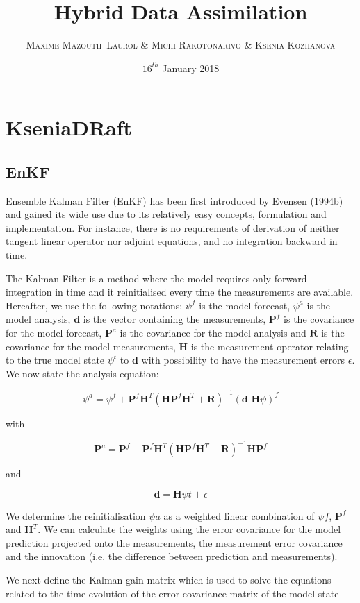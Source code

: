 \documentclass[a4,12pt]{article}
\title{\textbf{Hybrid Data Assimilation}}
\author{
\begin{tabular}{cc}
	\textsc{Maxime Mazouth--Laurol} \& \textsc{Michi Rakotonarivo} \& \textsc{Ksenia Kozhanova}
\end{tabular}}
\date{\small $16^{th}$ January 2018}
\begin{document}
\maketitle

\section{KseniaDRaft}
\subsection{EnKF}
Ensemble Kalman Filter (EnKF) has been first introduced by Evensen (1994b) and gained its wide use due to its relatively easy concepts, formulation and implementation. For instance, there is no requirements of derivation of neither tangent linear operator nor adjoint equations, and no integration backward in time.

The Kalman Filter is a method where the model requires only forward integration in time and it reinitialised every time the measurements are available. Hereafter, we use the following notations: $\psi^{f}$ is the model forecast, $\psi^{a}$ is the model analysis, $\textbf{d}$ is the vector containing the measurements, $\textbf{P}^{f}$ is the covariance for the model forecast, $\textbf{P}^{a}$ is the covariance for the model analysis and $\textbf{R}$ is the covariance for the model measurements, $\textbf{H}$ is the measurement operator relating to the true model state $\psi ^{t}$ to $\textbf{d}$ with possibility to have the measurement errors $\epsilon$. We now state the analysis equation:

$$\psi ^{a} = \psi ^{f} + \textbf{P} ^{f}\textbf{H} ^{T}(\textbf{HP} ^{f}\textbf{H} ^{T}+\textbf{R}) ^{-1}(\textbf{d-H}\psi) ^{f}$$

with

$$\textbf{P}^{a} = \textbf{P}^{f} - \textbf{P}^{f}\textbf{H}^{T}(\textbf{HP}^{f}\textbf{H}^{T}+\textbf{R})^{-1}\textbf{HP}^{f} $$

and 

$$\textbf{d} = \textbf{H}\psi{t} + \epsilon$$

We determine the reinitialisation $\psi{a}$ as a weighted linear combination of $\psi{f}$, $\textbf{P}^{f}$ and $\textbf{H}^{T}$. We can calculate the weights using the error covariance for the model prediction projected onto the measurements, the measurement error covariance and the innovation (i.e. the difference between prediction and measurements).     

We next define the Kalman gain matrix which is used to solve the equations related to the time evolution of the error covariance matrix of the model state
\end{document}
